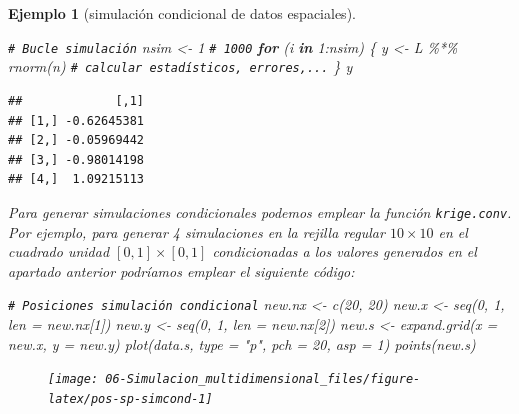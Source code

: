 \documentclass[
]{book}
\newenvironment{Shaded}{\begin{snugshade}}{\end{snugshade}}
\newcommand{\AttributeTok}[1]{\textcolor[rgb]{0.77,0.63,0.00}{#1}}
\newcommand{\CommentTok}[1]{\textcolor[rgb]{0.56,0.35,0.01}{\textit{#1}}}
\newcommand{\ControlFlowTok}[1]{\textcolor[rgb]{0.13,0.29,0.53}{\textbf{#1}}}
\newcommand{\DecValTok}[1]{\textcolor[rgb]{0.00,0.00,0.81}{#1}}
\newcommand{\FunctionTok}[1]{\textcolor[rgb]{0.00,0.00,0.00}{#1}}
\newcommand{\NormalTok}[1]{#1}
\newcommand{\OtherTok}[1]{\textcolor[rgb]{0.56,0.35,0.01}{#1}}
\newcommand{\SpecialCharTok}[1]{\textcolor[rgb]{0.00,0.00,0.00}{#1}}
\newcommand{\StringTok}[1]{\textcolor[rgb]{0.31,0.60,0.02}{#1}}
\theoremstyle{break}
\newtheorem{example}{Ejemplo}[chapter]
\theoremstyle{nonumberplain}
\renewcommand{\CommentTok}[1]{\textcolor[rgb]{0.41,0.41,0.41}{\texttt{#1}}}
\begin{document}
\begin{example}[simulación condicional de datos espaciales]
\begin{Shaded}
\begin{Highlighting}[]
\CommentTok{\# Bucle simulación}
\NormalTok{nsim }\OtherTok{\textless{}{-}} \DecValTok{1} \CommentTok{\# 1000}
\ControlFlowTok{for}\NormalTok{ (i }\ControlFlowTok{in} \DecValTok{1}\SpecialCharTok{:}\NormalTok{nsim) \{}
\NormalTok{  y }\OtherTok{\textless{}{-}}\NormalTok{ L }\SpecialCharTok{\%*\%} \FunctionTok{rnorm}\NormalTok{(n)}
  \CommentTok{\# calcular estadísticos, errores,...}
\NormalTok{\}}
\NormalTok{y}
\end{Highlighting}
\end{Shaded}

\begin{verbatim}
##             [,1]
## [1,] -0.62645381
## [2,] -0.05969442
## [3,] -0.98014198
## [4,]  1.09215113
\end{verbatim}

Para generar simulaciones condicionales podemos emplear la función \texttt{krige.conv}.
Por ejemplo, para generar 4 simulaciones en la rejilla regular \(10\times10\) en el cuadrado unidad \([0,1] \times [0,1]\) condicionadas a los valores generados en el apartado anterior podríamos emplear el siguiente código:

\begin{Shaded}
\begin{Highlighting}[]
\CommentTok{\# Posiciones simulación condicional}
\NormalTok{new.nx }\OtherTok{\textless{}{-}} \FunctionTok{c}\NormalTok{(}\DecValTok{20}\NormalTok{, }\DecValTok{20}\NormalTok{)}
\NormalTok{new.x }\OtherTok{\textless{}{-}} \FunctionTok{seq}\NormalTok{(}\DecValTok{0}\NormalTok{, }\DecValTok{1}\NormalTok{, }\AttributeTok{len =}\NormalTok{ new.nx[}\DecValTok{1}\NormalTok{])}
\NormalTok{new.y }\OtherTok{\textless{}{-}} \FunctionTok{seq}\NormalTok{(}\DecValTok{0}\NormalTok{, }\DecValTok{1}\NormalTok{, }\AttributeTok{len =}\NormalTok{ new.nx[}\DecValTok{2}\NormalTok{])}
\NormalTok{new.s }\OtherTok{\textless{}{-}} \FunctionTok{expand.grid}\NormalTok{(}\AttributeTok{x =}\NormalTok{ new.x, }\AttributeTok{y =}\NormalTok{ new.y)}
\FunctionTok{plot}\NormalTok{(data.s, }\AttributeTok{type =} \StringTok{"p"}\NormalTok{, }\AttributeTok{pch =} \DecValTok{20}\NormalTok{, }\AttributeTok{asp =} \DecValTok{1}\NormalTok{)}
\FunctionTok{points}\NormalTok{(new.s)}
\end{Highlighting}
\end{Shaded}

\begin{figure}[!htb]

{\centering \texttt{[image: 06-Simulacion\_multidimensional\_files/figure-latex/pos-sp-simcond-1]} 

}
\end{figure}
\end{example}
\end{document}
